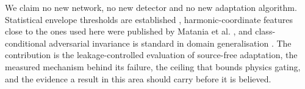 We claim no new network, no new detector and no new adaptation algorithm. Statistical envelope thresholds are established
\cite{borghesani2013,randall2011}, harmonic-coordinate features close to the ones used here were published by Matania et al.
\cite{matania2025}, and class-conditional adversarial invariance is standard in domain generalisation \cite{li2018ciddg}. The
contribution is the leakage-controlled evaluation of source-free adaptation, the measured mechanism behind its failure, the
ceiling that bounds physics gating, and the evidence a result in this area should carry before it is believed.
